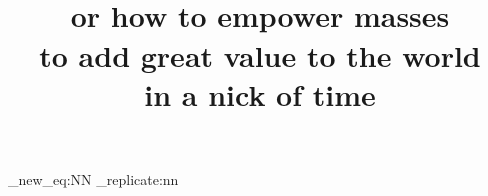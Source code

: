 

\title{\\  \huge or how to empower masses\\to add great value to the world\\in a nick of time}

\maketitle
\newpage
\tableofcontents  
\newpage
\listoftables
\newpage
\listoffigures

\setcounter{secnumdepth}{4}


\ExplSyntaxOn
\cs_new_eq:NN \Repeat \prg_replicate:nn
\ExplSyntaxOff


\newpage

\newpage


